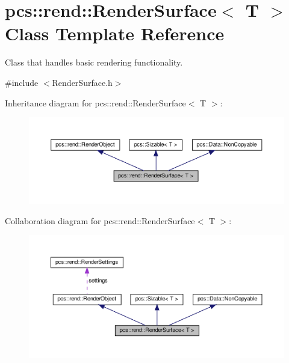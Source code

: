 \hypertarget{classpcs_1_1rend_1_1RenderSurface}{}\section{pcs\+:\+:rend\+:\+:Render\+Surface$<$ T $>$ Class Template Reference}
\label{classpcs_1_1rend_1_1RenderSurface}


Class that handles basic rendering functionality.  




{\ttfamily \#include $<$Render\+Surface.\+h$>$}



Inheritance diagram for pcs\+:\+:rend\+:\+:Render\+Surface$<$ T $>$\+:\nopagebreak
\begin{figure}[H]
\begin{center}
\leavevmode
\includegraphics[width=350pt]{classpcs_1_1rend_1_1RenderSurface__inherit__graph}
\end{center}
\end{figure}


Collaboration diagram for pcs\+:\+:rend\+:\+:Render\+Surface$<$ T $>$\+:\nopagebreak
\begin{figure}[H]
\begin{center}
\leavevmode
\includegraphics[width=350pt]{classpcs_1_1rend_1_1RenderSurface__coll__graph}
\end{center}
\end{figure}
